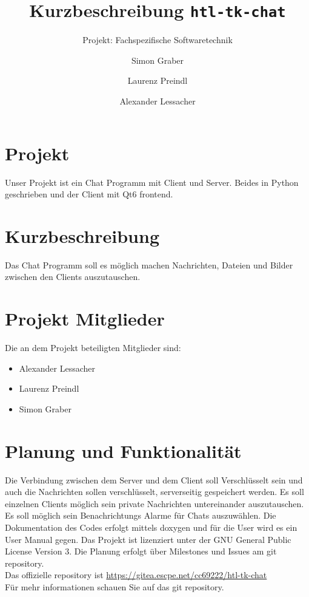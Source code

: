 \documentclass[a4paper,ngerman,headsepline]{scrreprt}
\begin{document}
\title{Kurzbeschreibung \texttt{htl-tk-chat}}
\subtitle{Projekt: Fachspezifische Softwaretechnik}
\author{Simon Graber \and Laurenz Preindl \and Alexander Lessacher}

\maketitle
\section*{Projekt}
Unser Projekt ist ein Chat Programm mit Client und Server. Beides in Python geschrieben und der Client mit Qt6 frontend.

\section*{Kurzbeschreibung}
Das Chat Programm soll es möglich machen Nachrichten, Dateien und Bilder zwischen den Clients auszutauschen. 

\section*{Projekt Mitglieder}
Die an dem Projekt beteiligten Mitglieder sind:
\begin{itemize}
 \item Alexander Lessacher
 \item Laurenz Preindl
 \item Simon Graber
\end{itemize}

\section*{Planung und Funktionalität}
Die Verbindung zwischen dem Server und dem Client soll Verschlüsselt sein und auch die Nachrichten sollen verschlüsselt, serverseitig gespeichert werden. Es soll einzelnen Clients möglich sein private Nachrichten untereinander auszutauschen. Es soll möglich sein Benachrichtungs Alarme für Chats auszuwählen. Die Dokumentation des Codes erfolgt mittels doxygen und für die User wird es ein User Manual gegen.
Das Projekt ist lizenziert unter der GNU General Public License Version 3.
Die Planung erfolgt über Milestones und Issues am git repository.\\
Das offizielle repository ist \url{https://gitea.escpe.net/cc69222/htl-tk-chat}\\
Für mehr informationen schauen Sie auf das git repository.
\end{document}
